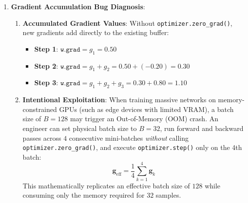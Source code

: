 \begin{enumerate}
\begin{enumerate}[label=(\alph*)]
        \item \textbf{With \texttt{drop\_last=True}}:
        \begin{equation*}
        N_{\text{batches}} = \left\lfloor \frac{1050}{64} \right\rfloor = \mathbf{16\text{ batches}}
        \end{equation*}
        Discarded samples: $1050 - (16 \times 64) = \mathbf{26\text{ samples}}$ dropped per epoch.

        \item \textbf{Total Updates Across 10 Epochs}:
        Each batch triggers exactly one \texttt{optimizer.step()}. With 17 batches per epoch:
        \begin{equation*}
        \text{Total Updates} = 17 \times 10 = \mathbf{170\text{ weight update steps}}
        \end{equation*}
    \end{enumerate}

    \item \textbf{Gradient Accumulation Bug Diagnosis}:
    \begin{enumerate}[label=(\alph*)]
        \item \textbf{Accumulated Gradient Values}:
        Without \texttt{optimizer.zero\_grad()}, new gradients add directly to the existing buffer:
        \begin{itemize}
            \item \textbf{Step 1}: $\texttt{w.grad} = g_1 = \mathbf{0.50}$
            \item \textbf{Step 2}: $\texttt{w.grad} = g_1 + g_2 = 0.50 + (-0.20) = \mathbf{0.30}$
            \item \textbf{Step 3}: $\texttt{w.grad} = g_1 + g_2 + g_3 = 0.30 + 0.80 = \mathbf{1.10}$
        \end{itemize}

        \item \textbf{Intentional Exploitation}:
        When training massive networks on memory-constrained GPUs (such as edge devices with limited VRAM), a batch size of $B=128$ may trigger an Out-of-Memory (OOM) crash. An engineer can set physical batch size to $B=32$, run forward and backward passes across $4$ consecutive mini-batches \textit{without} calling \texttt{optimizer.zero\_grad()}, and execute \texttt{optimizer.step()} only on the 4th batch:
        \begin{equation*}
        \mathbf{g}_{\text{eff}} = \frac{1}{4}\sum_{k=1}^4 \mathbf{g}_k
        \end{equation*}
        This mathematically replicates an effective batch size of $128$ while consuming only the memory required for $32$ samples.
    \end{enumerate}


\end{enumerate}
